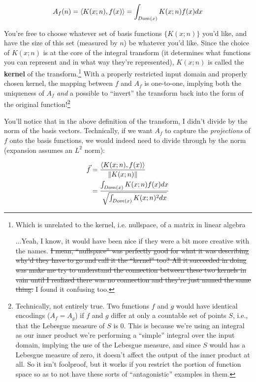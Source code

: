 \documentclass[letterpaper,12pt]{report}
\begin{document}
\[A_f(n) = \innerprod[K(x;n)][f(x)] 
  = \int_{Dom(x)} K(x;n) f(x) dx \]

You're free to choose whatever set of basis functions
\(\{K(x;n)\}\) you'd like, and have the size of this set
(measured by \(n\)) be whatever you'd like.
Since the choice of \(K(x;n)\) is at the core of
the integral transform (it determines what functions you
can represent and in what way they're represented),
\(K(x;n)\) is called the 
\textbf{kernel}
of the transform.\footnote{
  Which is unrelated to the kernel, i.e. nullspace, of a matrix in linear algebra\par
  ...Yeah, I know, it would have been nice if they were a
  bit more creative with the names. 
  \sout{I mean, ``nullspace''
  was perfectly good for what it was describing \textemdash{}
  why'd they have to go and call it the ``kernel'' too?
  All it succeeded in doing was make me try to understand
  the connection between these two kernels in vain until
  I realized there was no connection and they're just
  named the same thing.}
  I found it confusing too.
}
With a properly restricted input domain and properly
chosen kernel, the mapping between \(f\) and \(A_f\)
is one-to-one, implying both the uniqueness of \(A_f\)
\emph{and} a possible to ``invert'' the transform
back into the form of the original function!\footnote{
  Technically, not entirely true.
  Two functions \(f\) and \(g\) would have identical encodings
  (\(A_f = A_g\)) if \(f\) and \(g\)
  differ at only a countable set of points \(S\),
  i.e., that the Lebesgue measure of \(S\) is 0.
  This is because we're using an integral as our inner product
  \textemdash{}
  we're performing a ``simple'' integral over the input domain,
  implying the use of the Lebesgue measure,
  and since \(S\) would has a Lebesgue measure of zero,
  it doesn't affect the output of the inner product at all.
  So it isn't foolproof, but it works if you restrict
  the portion of function space so as to not have
  these sorts of ``antagonistic'' examples in them.
}\par

You'll notice that in the above definition of the transform,
I didn't divide by the norm of the basis vectors.
Technically, if we want \(A_f\) to capture the \emph{projections}
of \(f\) onto the basis functions, we would indeed need
to divide through by the norm
(expansion assumes an \(L^2\) norm):

\[\begin{split}
  \vec{f} &= \frac{\innerprod[K(x;n)][f(x)]}{\norm[K(x;n)]} \\
  &= \frac {\int_{Dom(x)} K(x;n) f(x) dx } {\sqrt{\int_{Dom(x)} K(x;n)^2 dx }}
\end{split}
\]
\end{document}
